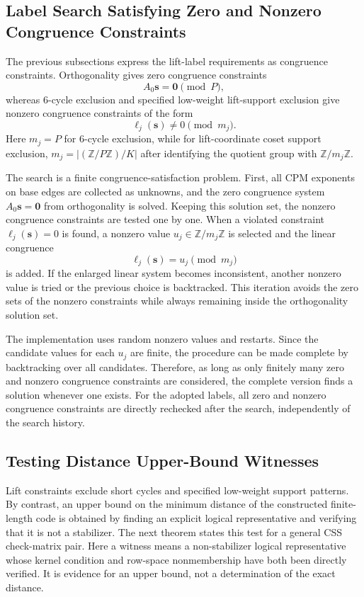 \documentclass[11pt,a4paper]{article}
\theoremstyle{uprighttheorem}
\begin{document}
\subsection{Label Search Satisfying Zero and Nonzero Congruence Constraints}\label{subsec:congruence-label-search}

The previous subsections express the lift-label requirements as congruence constraints.
Orthogonality gives zero congruence constraints
\[
  A_0\bm s=\bm 0\pmod P,
\]
whereas 6-cycle exclusion and specified low-weight lift-support exclusion give nonzero congruence constraints of the form
\[
  \ell_j(\bm s)\ne0\pmod {m_j}.
\]
Here \(m_j=P\) for 6-cycle exclusion, while for lift-coordinate coset support exclusion, \(m_j=|(\mathbb Z/P\mathbb Z)/K|\) after identifying the quotient group with \(\mathbb Z/m_j\mathbb Z\).

The search is a finite congruence-satisfaction problem.
First, all CPM exponents on base edges are collected as unknowns, and the zero congruence system \(A_0\bm s=\bm 0\) from orthogonality is solved.
Keeping this solution set, the nonzero congruence constraints are tested one by one.
When a violated constraint \(\ell_j(\bm s)=0\) is found, a nonzero value \(u_j\in\mathbb Z/m_j\mathbb Z\) is selected and the linear congruence
\[
  \ell_j(\bm s)=u_j\pmod {m_j}
\]
is added.
If the enlarged linear system becomes inconsistent, another nonzero value is tried or the previous choice is backtracked.
This iteration avoids the zero sets of the nonzero constraints while always remaining inside the orthogonality solution set.

The implementation uses random nonzero values and restarts.
Since the candidate values for each \(u_j\) are finite, the procedure can be made complete by backtracking over all candidates.
Therefore, as long as only finitely many zero and nonzero congruence constraints are considered, the complete version finds a solution whenever one exists.
For the adopted labels, all zero and nonzero congruence constraints are directly rechecked after the search, independently of the search history.

\subsection{Testing Distance Upper-Bound Witnesses}\label{subsec:distance-upper-bound-witness}

Lift constraints exclude short cycles and specified low-weight support patterns.
By contrast, an upper bound on the minimum distance of the constructed finite-length code is obtained by finding an explicit logical representative and verifying that it is not a stabilizer.
The next theorem states this test for a general CSS check-matrix pair.
Here a witness means a non-stabilizer logical representative whose kernel condition and row-space nonmembership have both been directly verified.
It is evidence for an upper bound, not a determination of the exact distance.
\end{document}
